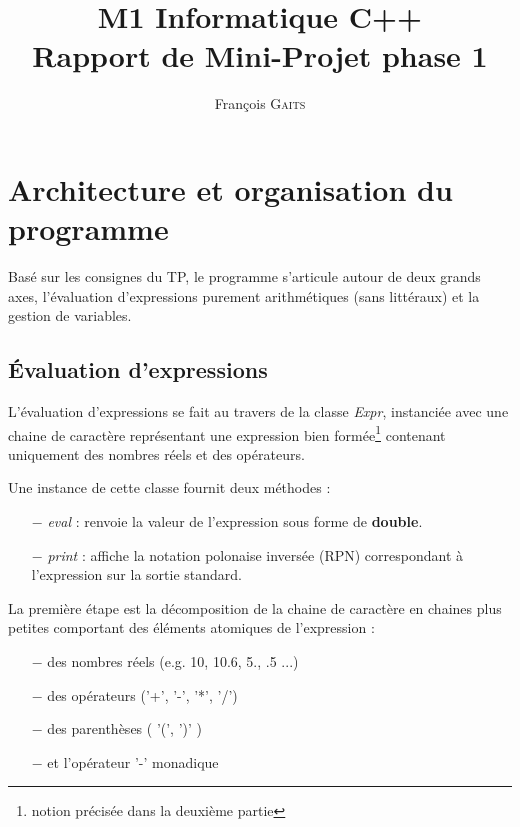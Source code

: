 \documentclass[]{article}
\author{François G\textsc{aits}}
\title{M1 Informatique C++\\Rapport de Mini-Projet phase 1}
\begin{document}
\maketitle

\section{Architecture et organisation du programme}
Basé sur les consignes du TP, le programme s'articule autour de deux grands axes, l'évaluation d'expressions purement arithmétiques (sans littéraux) et la gestion de variables. 

\subsection{\'Evaluation d'expressions}
L'évaluation d'expressions se fait au travers de la classe \textit{Expr}, instanciée avec une chaine de caractère représentant une expression bien formée\footnote{notion précisée dans la deuxième partie} contenant uniquement des nombres réels et des opérateurs.

Une instance de cette classe fournit deux méthodes : 
\begin{itemize}
\item[\hspace{.5cm}$-$]\textit{eval} : renvoie la valeur de l'expression sous forme de \textbf{double}.
\item[\hspace{.5cm}$-$]\textit{print} : affiche la notation polonaise inversée (RPN) correspondant à l'expression sur la sortie standard.
\end{itemize}\bigskip

La première étape est la décomposition de la chaine de caractère en chaines plus petites comportant des éléments atomiques de l'expression :
\begin{itemize}
\item[\hspace{.5cm}$-$]des nombres réels (e.g. 10, 10.6, 5., .5 ...)
\item[\hspace{.5cm}$-$]des opérateurs ('+', '-', '*', '/')
\item[\hspace{.5cm}$-$]des parenthèses ( '(', ')' )
\item[\hspace{.5cm}$-$]et l'opérateur '-' monadique
\end{itemize}\bigskip
\end{document}
